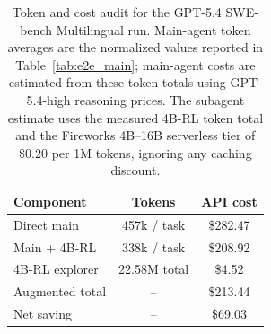 \begin{table}[t]
\centering
\caption{Token and cost audit for the GPT-5.4 SWE-bench Multilingual run. Main-agent token averages are the normalized values reported in Table~\ref{tab:e2e_main}; main-agent costs are estimated from these token totals using GPT-5.4-high reasoning prices. The subagent estimate uses the measured 4B-RL token total and the Fireworks 4B--16B serverless tier of \$0.20 per 1M tokens, ignoring any caching discount.}
\label{tab:runtime-cost}
\small
\setlength{\tabcolsep}{4pt}
\begin{tabular}{lcc}
\toprule
\textbf{Component} & \textbf{Tokens} & \textbf{API cost} \\
\midrule
Direct main & 457k / task & \$282.47 \\
Main + 4B-RL & 338k / task & \$208.92 \\
4B-RL explorer & 22.58M total & \$4.52 \\
\midrule
Augmented total & -- & \$213.44 \\
Net saving & -- & \$69.03 \\
\bottomrule
\end{tabular}
\end{table}